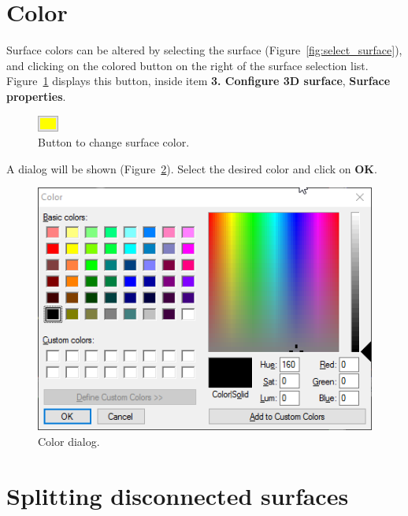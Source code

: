 \newpage

\section{Color}

Surface colors can be altered by selecting the surface (Figure~\ref{fig:select_surface}), and clicking on the colored button on the right of the surface selection list. Figure~\ref{fig:change_surface_color} displays this button, inside item \textbf{3. Configure 3D surface}, \textbf{Surface properties}.

\begin{figure}[!htb]
\centering
\includegraphics[scale=0.6]{../user_guide_figures/invesalius_screen/surface_button_select_color_yellow.png}
\caption{Button to change surface color.}
\label{fig:change_surface_color}
\end{figure}

A dialog will be shown (Figure~\ref{fig:button_select_color}). Select the desired color and click on \textbf{OK}.

\begin{figure}[!htb]
\centering
\includegraphics[scale=0.6]{../user_guide_figures/invesalius_screen/surface_select_color_windows_so_en.png}
\caption{Color dialog.}
\label{fig:button_select_color}
\end{figure}

\section{Splitting disconnected surfaces}

